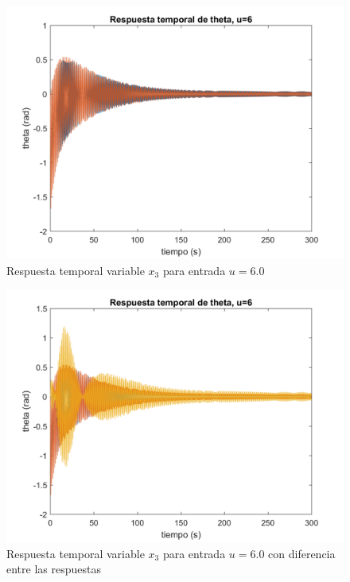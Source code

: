 \documentclass[journal]{IEEEtran}
\begin{document}
\begin{figure}[h!]
\caption{Respuesta temporal variable $x_3$ para entrada $u=6.0$\label{fig:u6}}
  \centering
\includegraphics[scale=0.19]{Graficaslvsnl/u6.png}
\end{figure}

\begin{figure}[h!]
\caption{Respuesta temporal variable $x_3$ para entrada $u=6.0$ con diferencia entre las respuestas\label{fig:u6dif}}
  \centering
\includegraphics[scale=0.19]{Graficaslvsnl/u6dif.png}
\end{figure}
\end{document}
